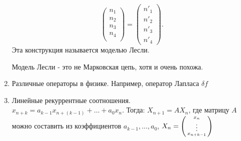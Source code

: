 \begin{examples}
\begin{enumerate}
\[\begin{pmatrix}
                n_1\\
                n_2\\
                n_3\\
                n_4\\
            \end{pmatrix}
             =
             \begin{pmatrix}
                 n'_1\\
                 n'_2\\
                 n'_3\\
                 n'_4
             \end{pmatrix}
            .\] 
            Эта конструкция называется моделью Лесли.
            \begin{remark}
                Модель Лесли - это не Марковская цепь, хотя и очень похожа.
            \end{remark}
        \item
            Различные операторы в физике. Например, оператор Лапласа $\delta f$
        \item
            Линейные рекуррентные соотношения.\\
            $x_{n + k} = a_{k-1}x_{n + (k - 1)} + \dots + a_0x_n$.
            Тогда:
            $X_{n + 1} = AX_n$, где матрицу $A$ можно составить из коэффициентов $a_{k - 1}, \dots, a_0$, 
            $X_n = \begin{psmallmatrix}
                x_n \\ \vdots \\ x_{n + k - 1}
            \end{psmallmatrix}$
    \end{enumerate}
\end{examples}
